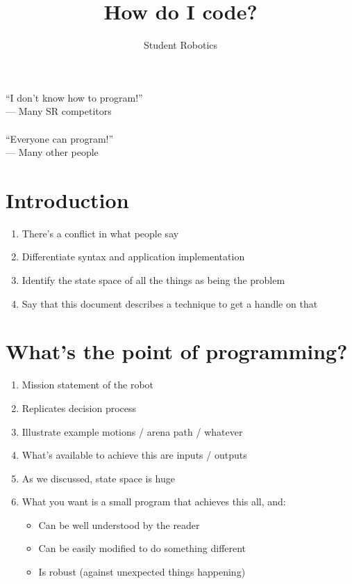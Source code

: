 \documentclass[a4paper,10pt]{article}
\title{How do I code?}
\author{Student Robotics}
\begin{document}
\maketitle

\hfill ``I don't know how to program!''\\
\hphantom{fgasdf}\hfill --- Many SR competitors\\
\\
``Everyone can program!''\\
--- Many other people\\

\section{Introduction}

\begin{enumerate}
\item There's a conflict in what people say
\item Differentiate syntax and application implementation
\item Identify the state space of all the things as being the problem
\item Say that this document describes a technique to get a handle on that
\end{enumerate}

\section{What's the point of programming?}
\begin{enumerate}
\item Mission statement of the robot
\item Replicates decision process
\item Illustrate example motions / arena path / whatever
\item What's available to achieve this are inputs / outputs
\item As we discussed, state space is huge
\item What you want is a small program that achieves this all, and:
\begin{itemize}
	\item Can be well understood by the reader
	\item Can be easily modified to do something different
	\item Is robust (against unexpected things happening)
\end{itemize}
\end{enumerate}
\end{document}
